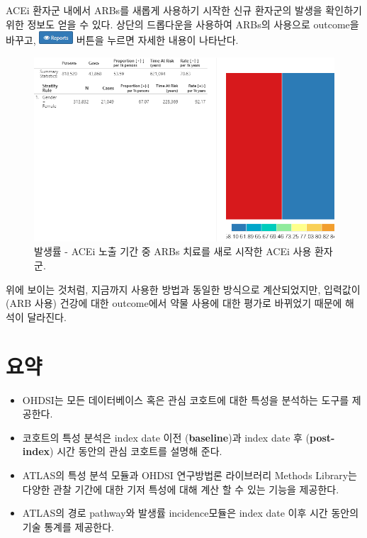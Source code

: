 \documentclass[10.5pt]{book}
\theoremstyle{definition}
\theoremstyle{definition}
\theoremstyle{definition}
\theoremstyle{remark}
\let\BeginKnitrBlock\begin \let\EndKnitrBlock\end
\begin{document}
ACEi 환자군 내에서 ARBs를 새롭게 사용하기 시작한 신규 환자군의 발생을
확인하기 위한 정보도 얻을 수 있다. 상단의 드롭다운을 사용하여 ARBs의
사용으로 outcome을 바꾸고,
\includegraphics{images/Characterization/atlasIncidenceReportButton.png}
버튼을 누르면 자세한 내용이 나타난다.

\begin{figure}

{\centering \includegraphics[width=1\linewidth]{images/Characterization/atlasIncidenceResultsARB} 

}

\caption{발생률 - ACEi 노출 기간 중 ARBs 치료를 새로 시작한 ACEi 사용 환자군.}\label{fig:atlasIncidenceResultsARB}
\end{figure}

위에 보이는 것처럼, 지금까지 사용한 방법과 동일한 방식으로 계산되었지만,
입력값이 (ARB 사용) 건강에 대한 outcome에서 약물 사용에 대한 평가로
바뀌었기 때문에 해석이 달라진다.

\section{요약}\label{-9}

\BeginKnitrBlock{rmdsummary}
\begin{itemize}
\item
  OHDSI는 모든 데이터베이스 혹은 관심 코호트에 대한 특성을 분석하는
  도구를 제공한다.
\item
  코호트의 특성 분석은 index date 이전 (\textbf{baseline})과 index date
  후 (\textbf{post-index}) 시간 동안의 관심 코호트를 설명해 준다.
\item
  ATLAS의 특성 분석 모듈과 OHDSI 연구방법론 라이브러리 Methods Library는
  다양한 관찰 기간에 대한 기저 특성에 대해 계산 할 수 있는 기능을
  제공한다.
\item
  ATLAS의 경로 pathway와 발생률 incidence모듈은 index date 이후 시간
  동안의 기술 통계를 제공한다.
\end{itemize}
\EndKnitrBlock{rmdsummary}
\end{document}
